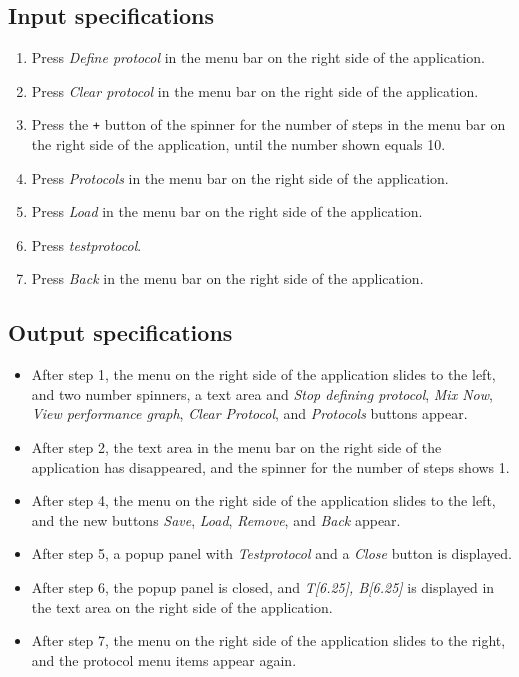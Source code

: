 \subsection*{Input specifications}
\begin{enumerate}
\item Press \emph{Define protocol} in the menu bar on the right side of the application.
\item Press \emph{Clear protocol} in the menu bar on the right side of the application.
\item Press the \texttt{+} button of the spinner for the number of steps in the menu bar on the right side of the application, until the number shown equals 10.
\item Press \emph{Protocols} in the menu bar on the right side of the application.
\item Press \emph{Load} in the menu bar on the right side of the application.
\item Press \emph{testprotocol}.
\item Press \emph{Back} in the menu bar on the right side of the application.
\end{enumerate}

\subsection*{Output specifications}
\begin{itemize}
\item After step 1, the menu on the right side of the application slides to the left, and two number spinners, a text area and \emph{Stop defining protocol}, \emph{Mix Now}, \emph{View performance graph}, \emph{Clear Protocol}, and \emph{Protocols} buttons appear.
\item After step 2, the text area in the menu bar on the right side of the application has disappeared, and the spinner for the number of steps shows 1.
\item After step 4, the menu on the right side of the application slides to the left, and the new buttons \emph{Save}, \emph{Load}, \emph{Remove}, and \emph{Back} appear.
\item After step 5, a popup panel with \emph{Testprotocol} and a \emph{Close} button is displayed.
\item After step 6, the popup panel is closed, and \emph{T[6.25], B[6.25]} is displayed in the text area on the right side of the application.
\item After step 7, the menu on the right side of the application slides to the right, and the protocol menu items appear again.
\end{itemize}

